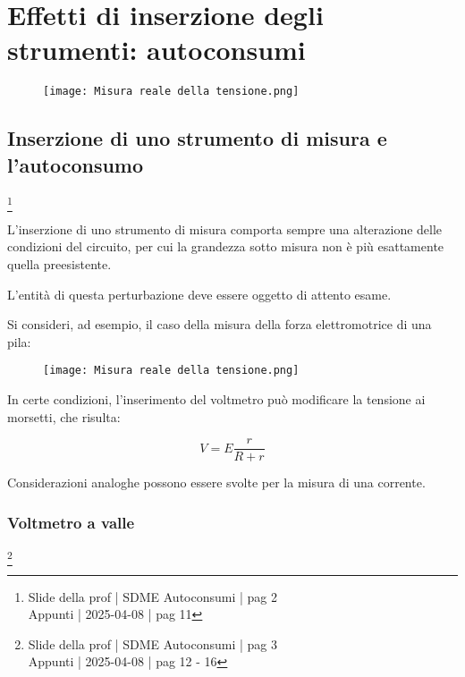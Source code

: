 \chapter{Effetti di inserzione degli strumenti: autoconsumi}

\begin{figure}[h]
    \centering
    \texttt{[image: Misura reale della tensione.png]}
\end{figure}

\newpage 

\section{Inserzione di uno strumento di misura e l'autoconsumo}
\footnote{Slide della prof | SDME Autoconsumi | pag 2 \\  
Appunti | 2025-04-08 | pag 11}

L'inserzione di uno strumento di misura comporta sempre una alterazione delle condizioni del circuito, 
per cui la grandezza sotto misura non è più esattamente quella preesistente. \newline 

L'entità di questa perturbazione deve essere oggetto di attento esame. \newline 

Si consideri, ad esempio, il caso della misura della forza elettromotrice di una pila: 

\begin{figure}[h]
    \centering
    \texttt{[image: Misura reale della tensione.png]}
\end{figure}


In certe condizioni, l'inserimento del voltmetro può modificare la tensione ai morsetti, che risulta: 


{
    \Large 
    \begin{equation}
        V = E \frac{r}{R + r}
    \end{equation}
}


Considerazioni analoghe possono essere svolte per la misura di una corrente. \newline 

\newpage 

\subsection{Voltmetro a valle}
\footnote{Slide della prof | SDME Autoconsumi | pag 3 \\  
Appunti | 2025-04-08 | pag 12 - 16}

